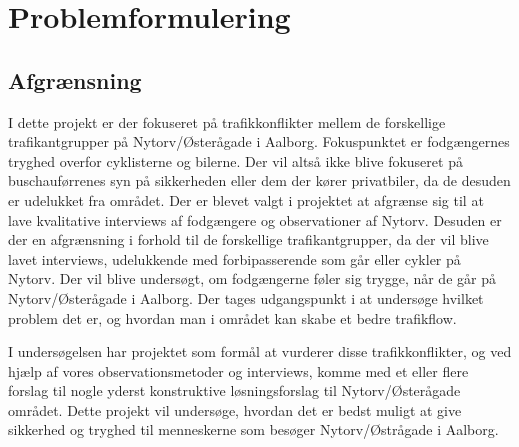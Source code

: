 \chapter{Problemformulering}
\label{chap:Problemformulering}

\newpage
\section{Afgrænsning}
\label{sec:afgraensning}

I dette projekt er der fokuseret på trafikkonflikter mellem de forskellige trafikantgrupper på Nytorv/Østerågade i Aalborg. Fokuspunktet er fodgængernes tryghed overfor cyklisterne og bilerne. Der vil altså ikke blive fokuseret på buschauførrenes syn på sikkerheden eller dem der kører privatbiler, da de desuden er udelukket fra området. Der er blevet valgt i projektet at afgrænse sig til at lave kvalitative interviews af fodgængere og observationer af Nytorv. Desuden er der en afgrænsning i forhold til de forskellige trafikantgrupper, da der vil blive lavet interviews, udelukkende med forbipasserende som går eller cykler på Nytorv. Der vil blive undersøgt, om fodgængerne føler sig trygge, når de går på Nytorv/Østerågade i Aalborg. Der tages udgangspunkt i at undersøge hvilket problem det er, og hvordan man i området kan skabe et bedre trafikflow.

I undersøgelsen har projektet som formål at vurderer disse trafikkonflikter, og ved hjælp af vores observationsmetoder og interviews, komme med et eller flere forslag til nogle yderst konstruktive løsningsforslag til Nytorv/Østerågade området.  Dette projekt vil undersøge, hvordan det er bedst muligt at give sikkerhed og tryghed til menneskerne som besøger Nytorv/Østrågade i Aalborg.
